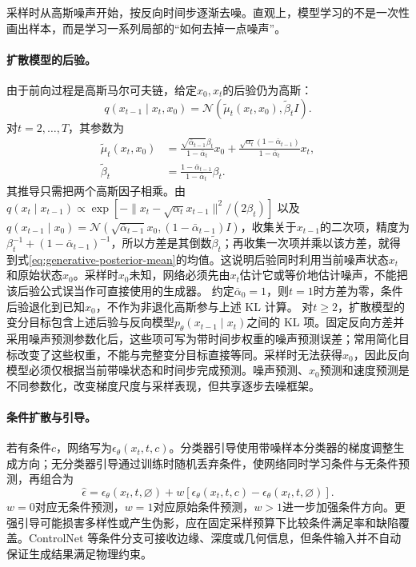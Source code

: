 采样时从高斯噪声开始，按反向时间步逐渐去噪。直观上，模型学习的不是一次性画出样本，而是学习一系列局部的“如何去掉一点噪声”。

\paragraph{扩散模型的后验。}
由于前向过程是高斯马尔可夫链，给定$x_0,x_t$的后验仍为高斯：
\begin{equation}
 q(x_{t-1}\mid x_t,x_0)=\mathcal{N}(\tilde\mu_t(x_t,x_0),\tilde\beta_tI).
\end{equation}
对$t=2,\ldots,T$，其参数为
\begin{align}
 \tilde\mu_t(x_t,x_0)&=\frac{\sqrt{\bar\alpha_{t-1}}\beta_t}{1-\bar\alpha_t}x_0
 +\frac{\sqrt{\alpha_t}(1-\bar\alpha_{t-1})}{1-\bar\alpha_t}x_t,\label{eq:generative-posterior-mean}\\
 \tilde\beta_t&=\frac{1-\bar\alpha_{t-1}}{1-\bar\alpha_t}\beta_t.
\end{align}
其推导只需把两个高斯因子相乘。由
$q(x_t\mid x_{t-1})\propto\exp[-\|x_t-\sqrt{\alpha_t}x_{t-1}\|^2/(2\beta_t)]$
以及
$q(x_{t-1}\mid x_0)=\mathcal N(\sqrt{\bar\alpha_{t-1}}x_0,(1-\bar\alpha_{t-1})I)$，收集关于$x_{t-1}$的二次项，精度为
$\beta_t^{-1}+(1-\bar\alpha_{t-1})^{-1}$，所以方差是其倒数$\tilde\beta_t$；再收集一次项并乘以该方差，就得到式\eqref{eq:generative-posterior-mean}的均值。这说明后验同时利用当前噪声状态$x_t$和原始状态$x_0$。采样时$x_0$未知，网络必须先由$x_t$估计它或等价地估计噪声，不能把该后验公式误当作可直接使用的生成器。
约定$\bar\alpha_0=1$，则$t=1$时方差为零，条件后验退化到已知$x_0$，不作为非退化高斯参与上述 KL 计算。
对$t\geq2$，扩散模型的变分目标包含上述后验与反向模型$p_\theta(x_{t-1}\mid x_t)$之间的 KL 项。固定反向方差并采用噪声预测参数化后，这些项可写为带时间步权重的噪声预测误差；常用简化目标改变了这些权重，不能与完整变分目标直接等同。采样时无法获得$x_0$，因此反向模型必须仅根据当前带噪状态和时间步完成预测。噪声预测、$x_0$预测和速度预测是不同参数化，改变梯度尺度与采样表现，但共享逐步去噪框架。

\paragraph{条件扩散与引导。}
若有条件$c$，网络写为$\epsilon_\theta(x_t,t,c)$。分类器引导使用带噪样本分类器的梯度调整生成方向；无分类器引导通过训练时随机丢弃条件，使网络同时学习条件与无条件预测，再组合为
\begin{equation}
 \hat\epsilon=\epsilon_\theta(x_t,t,\varnothing)
 +w[\epsilon_\theta(x_t,t,c)-\epsilon_\theta(x_t,t,\varnothing)].
\end{equation}
$w=0$对应无条件预测，$w=1$对应原始条件预测，$w>1$进一步加强条件方向。更强引导可能损害多样性或产生伪影，应在固定采样预算下比较条件满足率和缺陷覆盖。ControlNet 等条件分支可接收边缘、深度或几何信息，但条件输入并不自动保证生成结果满足物理约束。

